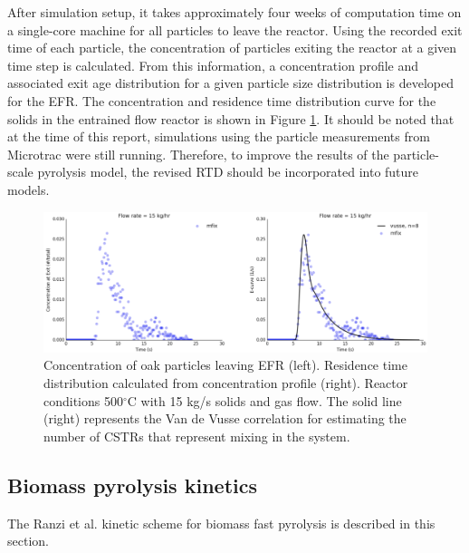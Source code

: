 After simulation setup, it takes approximately four weeks of computation time on a single-core machine for all particles to leave the reactor. Using the recorded exit time of each particle, the concentration of particles exiting the reactor at a given time step is calculated. From this information, a concentration profile and associated exit age distribution for a given particle size distribution is developed for the EFR. The concentration and residence time distribution curve for the solids in the entrained flow reactor is shown in Figure \ref{fig:mfix-restime}. It should be noted that at the time of this report, simulations using the particle measurements from Microtrac were still running. Therefore, to improve the results of the particle-scale pyrolysis model, the revised RTD should be incorporated into future models.

\begin{figure}[!ht]
	\centering
	\includegraphics[width=\textwidth]{figures/mfix-restime.png}
	\caption{Concentration of oak particles leaving EFR (left). Residence time distribution calculated from concentration profile (right). Reactor conditions 500$^{\circ}$C with 15 kg/s solids and gas flow. The solid line (right) represents the Van de Vusse correlation for estimating the number of CSTRs that represent mixing in the system.}
	\label{fig:mfix-restime}
\end{figure}

\subsection{Biomass pyrolysis kinetics}

The Ranzi et al. kinetic scheme for biomass fast pyrolysis is described in this section.

